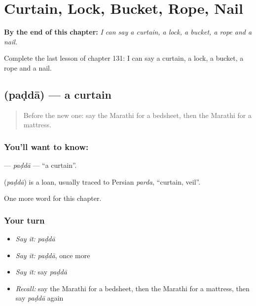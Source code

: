 
\chapter{Curtain, Lock, Bucket, Rope, Nail}
\label{ch:mr-curtain-lock-bucket-rope-nail}

\begin{chapteropening}
\textbf{By the end of this chapter:} \emph{I can say a curtain, a lock, a bucket, a rope and a nail.}

Complete the last lesson of chapter 131: I can say a curtain, a lock, a bucket, a rope and a nail.
\end{chapteropening}

\section[\texorpdfstring{\mr{पडदा} (paḍdā)}{पडदा (paḍdā)}]{ (paḍdā) — a curtain}

\label{lesson:MR-C131-padda}



\begin{quote}
Before the new one: say the Marathi for a bedsheet, then the Marathi for a mattress.
\end{quote}

\subsection*{You'll want to know: }
\textbf{} — \emph{paḍdā} — \textquotedblleft{}a curtain\textquotedblright{}.

\begin{cousinweb}
\textbf{} (\emph{paḍdā}) is a loan, usually traced to Persian \emph{parda}, \textquotedblleft{}curtain, veil\textquotedblright{}.
\end{cousinweb}

\begin{grammarlens}[title={What you've built}]
One more word for this chapter.
\end{grammarlens}

\subsection*{Your turn}
\begin{itemize}
\raggedright
  \item \emph{Say it:} \emph{paḍdā}
  \item \emph{Say it:} \emph{paḍdā}, once more
  \item \emph{Say it:} say \emph{paḍdā}
  \item \emph{Recall:} say the Marathi for a bedsheet, then the Marathi for a mattress, then say \emph{paḍdā} again
\end{itemize}

